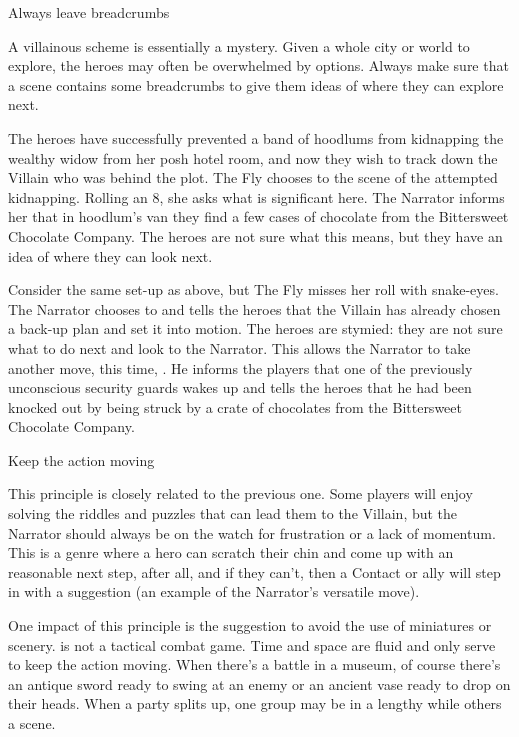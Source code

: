 \begin{principle}{Always leave breadcrumbs}
{
A villainous scheme is essentially a mystery.
Given a whole city or world to explore, the heroes may often
be overwhelmed by options.
Always make sure that a scene contains some breadcrumbs to give them
ideas of where they can explore next.

\begin{example}
  The heroes have successfully prevented a band of hoodlums from
  kidnapping the wealthy widow from her posh hotel room, and now they
  wish to track down the Villain who was behind the plot.
  The Fly chooses to  the scene of the attempted
  kidnapping. Rolling an 8, she asks what is significant here.
  The Narrator informs her that in hoodlum's van they find a few
  cases of chocolate from the Bittersweet Chocolate Company.
  The heroes are not sure what this means, but they have an idea
  of where they can look next.
\end{example}

\begin{example}
  Consider the same set-up as above, but The Fly misses her roll
  with snake-eyes. The Narrator chooses to  and tells the heroes that the Villain has already chosen
  a back-up plan and set it into motion.
  The heroes are stymied: they are not sure what to do next and look
  to the Narrator. This allows the Narrator to take another move,
  this time, . He informs the players that
  one of the previously unconscious security guards wakes up and
  tells the heroes that he had been knocked out by being struck
  by a crate of chocolates from the Bittersweet Chocolate Company.  
\end{example}
}
\end{principle}

\begin{principle}{Keep the action moving}
{
This principle is closely related to the previous one.  Some players
will enjoy solving the riddles and puzzles that can lead them to the
Villain, but the Narrator should always be on the watch for
frustration or a lack of momentum.  This is a genre where a hero can
scratch their chin and come up with an reasonable next step, after
all, and if they can't, then a Contact or ally will step in with a
suggestion (an example of the Narrator's versatile  move).

One impact of this principle is the suggestion to avoid the use of
miniatures or scenery. \kapow{} is not a tactical combat game. Time
and space are fluid and only serve to keep the action moving.  When
there's a battle in a museum, of course there's an antique sword ready
to swing at an enemy or an ancient vase ready to drop on their heads.
When a party splits up, one group may be in a lengthy 
while others  a scene.
}
\end{principle}


